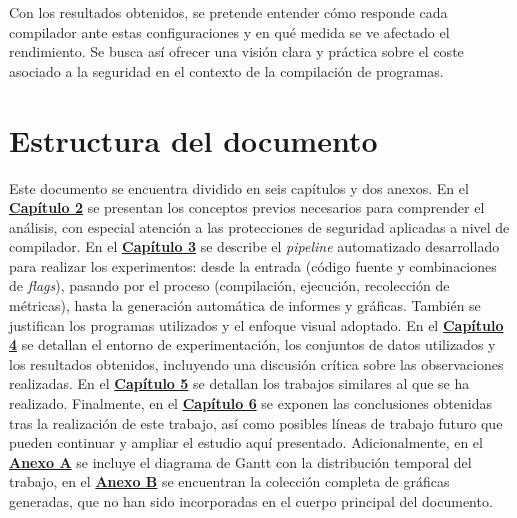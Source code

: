 Con los resultados obtenidos, se pretende entender cómo responde cada
compilador ante estas configuraciones y en qué medida se ve afectado el
rendimiento. Se busca así ofrecer una visión clara y práctica sobre el
coste asociado a la seguridad en el contexto de la compilación de
programas.

\section{Estructura del documento}

Este documento se encuentra dividido en seis capítulos y dos anexos. En el 
\hyperref[chap:fundamentos]{\textbf{Capítulo 2}} se presentan los conceptos previos necesarios para comprender el 
análisis, con especial atención a las protecciones de seguridad aplicadas a nivel de compilador. En el 
\hyperref[chap:metodologia]{\textbf{Capítulo 3}} se describe el \emph{pipeline} automatizado desarrollado para realizar 
los experimentos: desde la entrada (código fuente y combinaciones de \emph{flags}), pasando por el proceso 
(compilación, ejecución, recolección de métricas), hasta la generación automática de informes y gráficas. También 
se justifican los programas utilizados y el enfoque visual adoptado. En el 
\hyperref[chap:resultados]{\textbf{Capítulo 4}} se detallan el entorno de experimentación, los conjuntos de datos 
utilizados y los resultados obtenidos, incluyendo una discusión crítica sobre las observaciones realizadas. En el
\hyperref[chap:trabajo]{\textbf{Capítulo 5}} se detallan los trabajos similares al que se ha realizado.
Finalmente, en el \hyperref[chap:conclusiones]{\textbf{Capítulo 6}} se exponen las conclusiones obtenidas  tras la realización
de este trabajo, así como posibles líneas de trabajo futuro que pueden continuar y ampliar el estudio aquí presentado.
Adicionalmente, en el \hyperref[chap:anexoA]{\textbf{Anexo A}} se incluye el diagrama de Gantt con la distribución temporal del trabajo, en
el \hyperref[chap:anexoB]{\textbf{Anexo B}} se encuentran la colección completa de gráficas generadas, que no han sido incorporadas en el cuerpo principal del documento.
